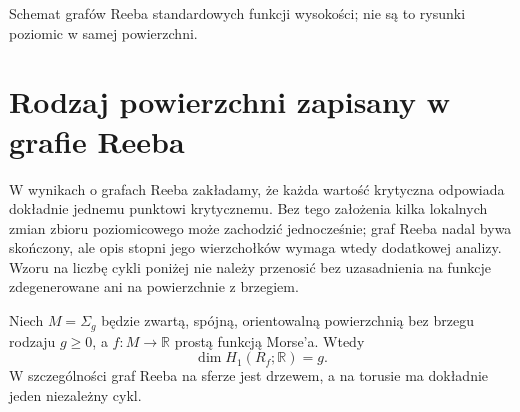 \begin{samepage}
\begin{center}
\begin{minipage}{.96\linewidth}\centering
{}\par\smallskip

{\footnotesize Schemat grafów Reeba standardowych funkcji wysokości;
nie są to rysunki poziomic w samej powierzchni.}
\end{minipage}
\end{center}
\end{samepage}

\section{Rodzaj powierzchni zapisany w grafie Reeba}
\label{sec:tg-reeb-genus}

\begin{uwaga}
W wynikach o grafach Reeba zakładamy, że każda wartość
krytyczna odpowiada dokładnie jednemu punktowi krytycznemu.
Bez tego założenia kilka lokalnych zmian zbioru poziomicowego
może zachodzić jednocześnie; graf Reeba nadal bywa skończony,
ale opis stopni jego wierzchołków wymaga wtedy dodatkowej
analizy. Wzoru na liczbę cykli poniżej nie należy przenosić
bez uzasadnienia na funkcje zdegenerowane ani na powierzchnie
z brzegiem.
\end{uwaga}

\begin{twierdzenie}
\label{thm:tg-reeb-betti}
Niech $M=\Sigma_g$ będzie zwartą, spójną, orientowalną
powierzchnią bez brzegu rodzaju $g\ge0$, a
$f:M\to\mathbb R$ prostą funkcją Morse'a. Wtedy
\[
\dim H_1(R_f;\mathbb R)=g.
\]
W szczególności graf Reeba na sferze jest drzewem,
a na torusie ma dokładnie jeden niezależny cykl.
\end{twierdzenie}

